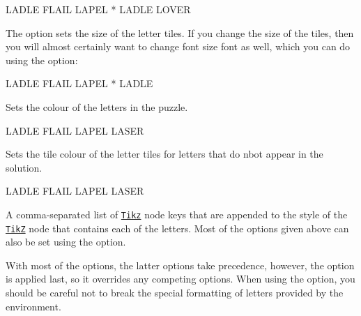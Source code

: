 \documentclass[svgnames]{report}
\newcommand\ctan[1]{\href{https://www.ctan.org/pkg/#1}{\texttt{#1}}}
\begin{document}
  \begin{example}
    \begin{wordle}[shape=circle]{LADLE}
       FLAIL LAPEL * LADLE LOVER
    \end{wordle}
  \end{example}


  The  option sets the size of the 
  letter tiles.  If you change the size  of the tiles, then you will
  almost certainly want to change font size font as well, which you can
  do using the  option:

  \begin{example}
    \begin{wordle}[size=10mm, font=\huge\bfseries]{LADLE}
       FLAIL LAPEL * LADLE
    \end{wordle}
  \end{example}


  Sets the colour of the letters in the  puzzle.

  \begin{example}
    \begin{wordle}[text=DarkSlateGrey]{LADLE}
       FLAIL LAPEL LASER
    \end{wordle}
  \end{example}


  Sets the tile colour of the  letter tiles for letters
  that do nbot appear in the solution.

  \begin{example}
    \begin{wordle}[wrong=red]{LADLE}
       FLAIL LAPEL LASER
    \end{wordle}
  \end{example}


  A comma-separated list of \ctan{Tikz} node keys that are appended to
  the style of the \ctan{TikZ} node that contains each of the
   letters.  Most of the options given above can also be
  set using the  option.

  With most of the  options, the latter options take
  precedence, however, the  option is applied last,
  so it overrides any competing options. When using the
   option, you should be careful not to break the
  special formatting of letters provided by the 
  environment.\par
\end{document}
